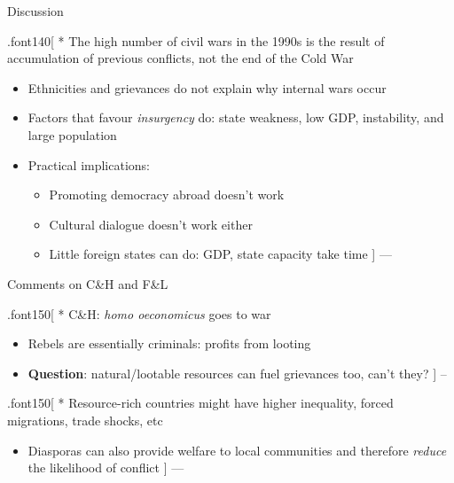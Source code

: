 \documentclass[ignorenonframetext,]{beamer}
\providecommand{\tightlist}{%
  \setlength{\itemsep}{0pt}\setlength{\parskip}{0pt}}
\begin{document}
\begin{frame}{Discussion}

.font140{[} * The high number of civil wars in the 1990s is the result
of accumulation of previous conflicts, not the end of the Cold War

\begin{itemize}
\item
  Ethnicities and grievances do not explain why internal wars occur
\item
  Factors that favour \emph{insurgency} do: state weakness, low GDP,
  instability, and large population
\item
  Practical implications:

  \begin{itemize}
  \tightlist
  \item
    Promoting democracy abroad doesn't work
  \item
    Cultural dialogue doesn't work either
  \item
    Little foreign states can do: GDP, state capacity take time {]} ---
  \end{itemize}
\end{itemize}

\end{frame}

\begin{frame}{Comments on C\&H and F\&L}

.font150{[} * C\&H: \emph{homo oeconomicus} goes to war

\begin{itemize}
\item
  Rebels are essentially criminals: profits from looting
\item
  \textbf{Question}: natural/lootable resources can fuel grievances too,
  can't they? {]} --
\end{itemize}

.font150{[} * Resource-rich countries might have higher inequality,
forced migrations, trade shocks, etc

\begin{itemize}
\tightlist
\item
  Diasporas can also provide welfare to local communities and therefore
  \emph{reduce} the likelihood of conflict {]} ---
\end{itemize}

\end{frame}
\end{document}
